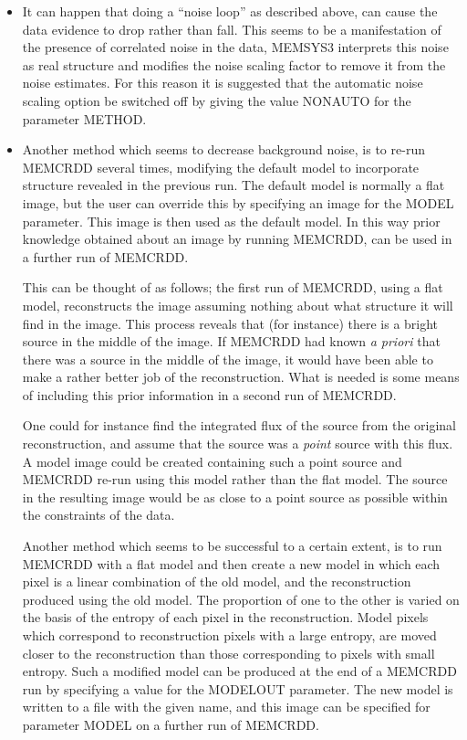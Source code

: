 \begin {itemize}
\item It can happen that doing a ``noise loop'' as described above, can cause
the data evidence to drop rather than fall. This seems to be a manifestation of
the presence of correlated noise in the data, MEMSYS3 interprets this noise as
real structure and modifies the noise scaling factor to remove it from the
noise estimates. For this reason it is suggested that the automatic noise
scaling option be switched off by giving the value NONAUTO for the parameter
METHOD.

\item Another method which seems to decrease background noise, is to re-run
MEMCRDD several times, modifying the default model to incorporate structure
revealed in the previous run. The default model is normally a flat image, but
the user can override this by specifying an image for the MODEL parameter. This
image is then used as the default model.  In this way prior knowledge obtained
about an image by running MEMCRDD, can be used in a further run of MEMCRDD.

This can be thought of as follows; the first run of MEMCRDD, using a flat
model, reconstructs the image assuming nothing about what structure it will
find in the image. This process reveals that (for instance) there is a bright
source in the middle of the image. If MEMCRDD had known {\em a priori} that
there was a source in the middle of the image, it would have been able to make
a rather better job of the reconstruction. What is needed is some means of
including this prior information in a second run of MEMCRDD.

One could for instance find the integrated flux of the source from the original
reconstruction, and assume that the source was a {\em point} source with this
flux. A model image could be created containing such a point source and MEMCRDD
re-run using this model rather than the flat model. The source in the resulting
image would be as close to a point source as possible within the constraints
of the data.

Another method which seems to be successful to a certain extent, is to run
MEMCRDD with a flat model and then create a new model in which each pixel is a
linear combination of the old model, and the reconstruction produced using the
old model. The proportion of one to the other is varied on the basis of the
entropy of each pixel in the reconstruction. Model pixels which correspond to
reconstruction pixels with a large entropy, are moved closer to the
reconstruction than those corresponding to pixels with small entropy. Such a
modified model can be produced at the end of a MEMCRDD run by specifying a
value for the MODELOUT parameter. The new model is written to a file with the
given name, and this image can be specified for parameter MODEL on a further
run of MEMCRDD.


\end{itemize}
